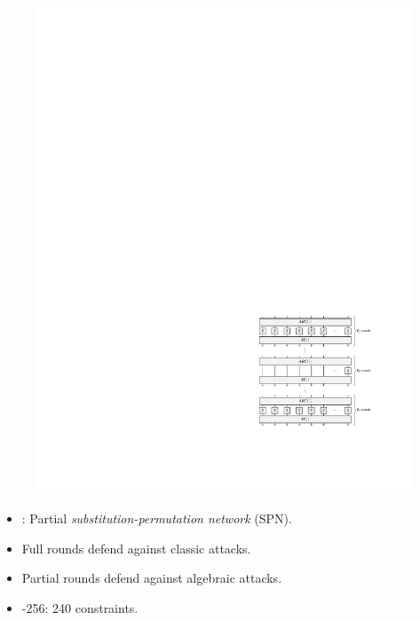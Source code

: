 \documentclass[beamer={10pt,xcolor=dvipsnames},target=mst]{thud}
\begin{document}
\begin{frame}{\Poseidon{}~\cite{GrassiKRRS2021}}
  \begin{figure}
    \centering
    \includegraphics[scale=0.6]{res/GrassiKRRS2021.pdf}
  \end{figure}
  \begin{itemize}
    \item \Poseidon{}: Partial \emph{substitution-permutation network} (SPN).
    \item Full rounds defend against classic attacks.
    \item Partial rounds defend against algebraic attacks.
    \item \Poseidon{}-256: 240 constraints.
  \end{itemize}
\end{frame}
\end{document}
